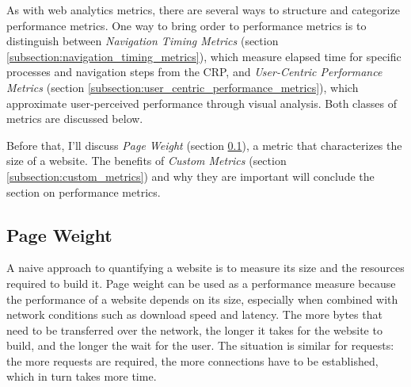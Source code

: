 As with web analytics metrics, there are several ways to structure and categorize performance metrics.
One way to bring order to performance metrics is to distinguish between \textit{Navigation Timing Metrics} (section \ref{subsection:navigation_timing_metrics}), which measure elapsed time for specific processes and navigation steps from the CRP, and \textit{User-Centric Performance Metrics} (section \ref{subsection:user_centric_performance_metrics}), which approximate user-perceived performance through visual analysis.
Both classes of metrics are discussed below.

Before that, I'll discuss \textit{Page Weight} (section \ref{subsection:page_weight}), a metric that characterizes the size of a website.
The benefits of \textit{Custom Metrics} (section \ref{subsection:custom_metrics}) and why they are important will conclude the section on performance metrics.











\subsection{Page Weight} %
\label{subsection:page_weight}

A naive approach to quantifying a website is to measure its size and the resources required to build it.
Page weight can be used as a performance measure because the performance of a website depends on its size, especially when combined with network conditions such as download speed and latency.
The more bytes that need to be transferred over the network, the longer it takes for the website to build, and the longer the wait for the user.
The situation is similar for requests: the more requests are required, the more connections have to be established, which in turn takes more time.

